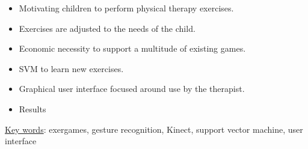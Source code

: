 \begin{itemize}
\item Motivating children to perform physical therapy exercises.
\item Exercises are adjusted to the needs of the child.
\item Economic necessity to support a multitude of existing games.
\item SVM to learn new exercises.
\item Graphical user interface focused around use by the therapist.
\item Results
\end{itemize}

\underline{Key words}: exergames, gesture recognition, Kinect, support vector machine, user interface